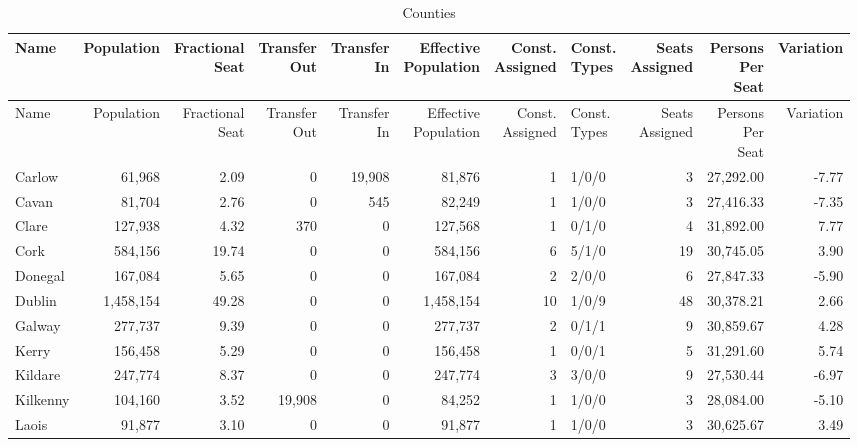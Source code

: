 \documentclass[a4paper]{article}
\begin{document}
\begin{longtable}{lrrrrrrlrrr}
\caption{Counties}
\\ \toprule
Name &Population &\shortstack{Fractional\\Seat} &\shortstack{Transfer\\Out} &\shortstack{Transfer\\In} &\shortstack{Effective\\Population} &\shortstack{Const.\\Assigned} &\shortstack{Const.\\Types} &\shortstack{Seats\\Assigned} &\shortstack{Persons\\Per\\Seat} &Variation \\ \midrule
\endfirsthead
\toprule
Name &Population &\shortstack{Fractional\\Seat} &\shortstack{Transfer\\Out} &\shortstack{Transfer\\In} &\shortstack{Effective\\Population} &\shortstack{Const.\\Assigned} &\shortstack{Const.\\Types} &\shortstack{Seats\\Assigned} &\shortstack{Persons\\Per\\Seat} &Variation \\ \midrule
\endhead
\bottomrule
\endfoot
Carlow&61,968& 2.09&0&19,908&81,876&1&1/0/0&3&27,292.00&-7.77\\ 
Cavan&81,704& 2.76&0&545&82,249&1&1/0/0&3&27,416.33&-7.35\\ 
Clare&127,938& 4.32&370&0&127,568&1&0/1/0&4&31,892.00& 7.77\\ 
Cork&584,156&19.74&0&0&584,156&6&5/1/0&19&30,745.05& 3.90\\ 
Donegal&167,084& 5.65&0&0&167,084&2&2/0/0&6&27,847.33&-5.90\\ 
Dublin&1,458,154&49.28&0&0&1,458,154&10&1/0/9&48&30,378.21& 2.66\\ 
Galway&277,737& 9.39&0&0&277,737&2&0/1/1&9&30,859.67& 4.28\\ 
Kerry&156,458& 5.29&0&0&156,458&1&0/0/1&5&31,291.60& 5.74\\ 
Kildare&247,774& 8.37&0&0&247,774&3&3/0/0&9&27,530.44&-6.97\\ 
Kilkenny&104,160& 3.52&19,908&0&84,252&1&1/0/0&3&28,084.00&-5.10\\ 
Laois&91,877& 3.10&0&0&91,877&1&1/0/0&3&30,625.67& 3.49\\ 

\end{longtable}
\end{document}
